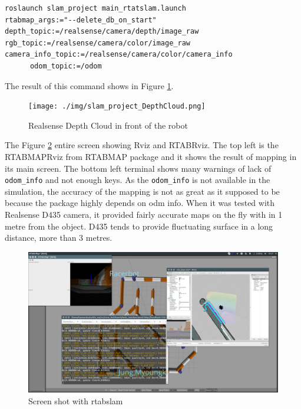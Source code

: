 \documentclass[10pt,journal,compsoc]{IEEEtran}
\begin{document}
\begin{lstlisting}[language={[Sharp]C}, caption={RTABMAP integrated racerbot launch command},label={list:RTABMAPracerbotlaunch}]
roslaunch slam_project main_rtatslam.launch
rtabmap_args:="--delete_db_on_start" 
depth_topic:=/realsense/camera/depth/image_raw
rgb_topic:=/realsense/camera/color/image_raw
camera_info_topic:=/realsense/camera/color/camera_info
      odom_topic:=/odom
\end{lstlisting}

The result of this command shows in Figure \ref{fig:slam_project_DepthCloud}.
\begin{figure}[thpb]
      \centering
      \texttt{[image: ./img/slam\_project\_DepthCloud.png]}
      \caption{Realsense Depth Cloud in front of the robot}
      \label{fig:slam_project_DepthCloud}
\end{figure}
The Figure \ref{fig:rtabslam_racerbot} entire screen showing Rviz and RTABRviz. The top left is the RTABMAPRviz from RTABMAP package and it shows the result of mapping in its main screen. The bottom left terminal shows many warnings of lack of \verb!odom_info! and not enough keys. As the \verb!odom_info! is not available in the simulation, the accuracy of the mapping is not as great as it supposed to be because the package highly depends on odm info. When it was tested with Realsense D435 camera, it provided fairly accurate maps on the fly with in 1 metre from the object. D435 tends to provide fluctuating surface in a long distance, more than 3 metres.

\begin{figure}[thpb]
      \centering
      \includegraphics[width=\linewidth]{./img/rtabslam_racerbot.png}
      \caption{Screen shot with rtabslam}
      \label{fig:rtabslam_racerbot}
\end{figure}
\end{document}
